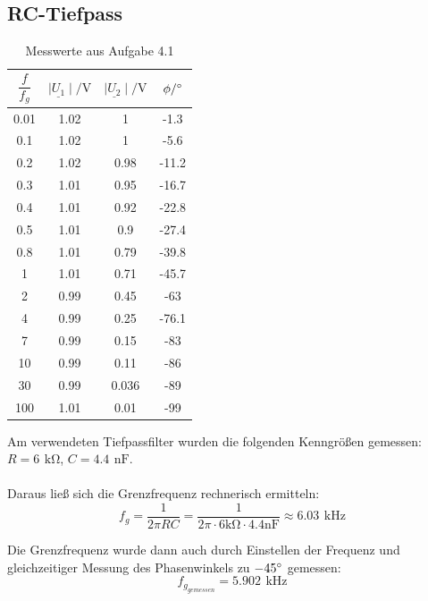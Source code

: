 \documentclass[a4paper, 12pt]{article}
\begin{document}
  \subsection{RC-Tiefpass}

    \begin{table}[H]
    \begin{center}
    \begin{tabular}{|c|c|c|c|}
    \hline
    $\dfrac{f}{f_g}$  & $ \mid \underline{U_1} \mid / \si{\volt}$   & $\mid \underline{U_2} \mid / \si{\volt}$    & $\phi / \degree$ \\
    \hline
    0.01 & 1.02 & 1     & -1.3  \\
    0.1  & 1.02 & 1     & -5.6  \\
    0.2  & 1.02 & 0.98  & -11.2 \\
    0.3  & 1.01 & 0.95  & -16.7 \\
    0.4  & 1.01 & 0.92  & -22.8 \\
    0.5  & 1.01 & 0.9   & -27.4 \\
    0.8  & 1.01 & 0.79  & -39.8 \\
    1    & 1.01 & 0.71  & -45.7 \\
    2    & 0.99 & 0.45  & -63   \\
    4    & 0.99 & 0.25  & -76.1 \\
    7    & 0.99 & 0.15  & -83   \\
    10   & 0.99 & 0.11  & -86   \\
    30   & 0.99 & 0.036 & -89   \\
    100  & 1.01 & 0.01  & -99   \\
    \hline
    \end{tabular}
    \end{center}
    \caption*{Messwerte aus Aufgabe 4.1}
    \end{table}

    \noindent Am verwendeten Tiefpassfilter wurden die folgenden Kenngrößen gemessen:\\
    \vspace{0.4cm}
    $R = 6 \,\ \si{\kilo\ohm}$,
    $C = 4.4 \,\ \si{\nano\farad}$.\\\\
    Daraus ließ sich die Grenzfrequenz rechnerisch ermitteln:
    $$ f_g = \frac{1}{2 \pi R C} = \frac{1}{ 2 \pi \cdot 6 \si{\kilo\ohm} \cdot 4.4 \si{\nano\farad}} \approx 6.03 \,\ \si{\kilo\hertz}$$

    \noindent Die Grenzfrequenz wurde dann auch durch Einstellen der Frequenz und gleichzeitiger Messung des Phasenwinkels zu $-45 \degree$ gemessen:
    $$f_{g_{gemessen}} = 5.902 \,\ \si{\kilo\hertz}$$
\end{document}
